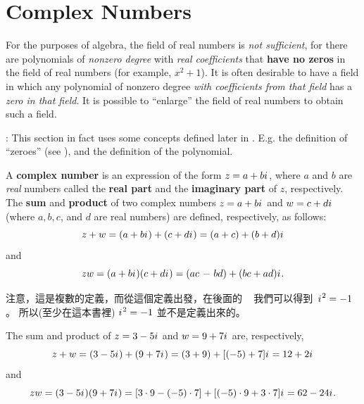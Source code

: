 \section{Complex Numbers} \label{sec 8.d}

For the purposes of algebra, the field of real numbers is \emph{not sufficient}, for there are polynomials of \emph{nonzero degree} with \emph{real coefficients} that \textbf{have no zeros} in the field of real numbers (for example, \(x^2 + 1\)).
It is often desirable to have a field in which any polynomial of nonzero degree \emph{with coefficients from that field} has a \emph{zero in that field}.
It is possible to ``enlarge'' the field of real numbers to obtain such a field.

\begin{note}
: This section in fact uses some concepts defined later in .
E.g. the definition of ``zeroes'' (see ), and the definition of the polynomial.
\end{note}

\begin{appendix definition} \label{def d.1}
A \textbf{complex number} is an expression of the form \(z = a + b {i\mkern1mu}\), where \(a\) and \(b\) are \emph{real} numbers called the \textbf{real part} and the \textbf{imaginary part} of \(z\), respectively.
The \textbf{sum} and \textbf{product} of two complex numbers \(z = a + b {i\mkern1mu}\) and \(w = c + d {i\mkern1mu}\) (where \(a, b, c\), and \(d\) are real numbers) are defined, respectively, as follows:
\[
    z + w = (a + b{i\mkern1mu}) + (c + d{i\mkern1mu}) = (a + c) + (b + d) {i\mkern1mu}
\]
and
\[
    zw = (a + b\iu)(c + d\iu) = (ac\ \RED{-}\ bd) + (bc + ad)\iu.
\]
\end{appendix definition}

\begin{note}
注意，這是複數的定義，而從這個定義出發，在後面的 \  我們可以得到\ \({i\mkern1mu}^2 = -1\)。
所以(至少在這本書裡) \({i\mkern1mu}^2 = -1\) 並不是定義出來的。
\end{note}

\begin{example} \label{example d.1}
The sum and product of \(z = 3 - 5{i\mkern1mu}\) and \(w = 9 + 7{i\mkern1mu}\) are, respectively,
\[
    z + w = (3 - 5{i\mkern1mu}) + (9 + 7{i\mkern1mu}) = (3 + 9) + [(-5) + 7]{i\mkern1mu} = 12 + 2{i\mkern1mu}
\]
and
\[
    zw = (3 - 5{i\mkern1mu})(9 + 7{i\mkern1mu}) = [3 \cdot 9 - (-5) \cdot 7] + [(-5) \cdot 9 + 3 \cdot 7]{i\mkern1mu} = 62 - 24{i\mkern1mu}.
\]
\end{example}

